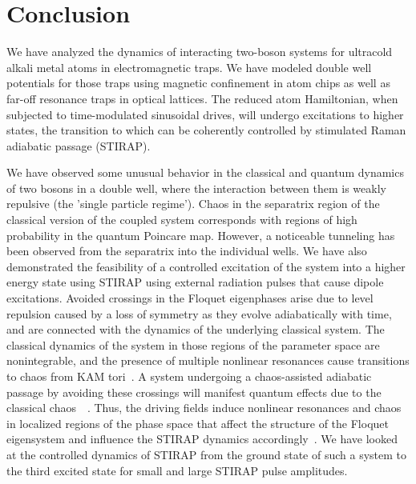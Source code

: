\chapter{Conclusion}
%
\label{chapter-conclusion}
We have analyzed the dynamics of interacting two-boson systems for ultracold alkali metal atoms in electromagnetic traps. We have modeled double well potentials for those traps using magnetic confinement in atom chips as well as far-off resonance traps in optical lattices. The reduced atom Hamiltonian, when subjected to time-modulated sinusoidal drives, will undergo excitations to higher states, the transition to which can be coherently controlled by stimulated Raman adiabatic passage (STIRAP).

We have observed some unusual behavior in the classical and quantum dynamics of two bosons in a double well, where the interaction between them is weakly repulsive (the 'single particle regime'). Chaos in the separatrix region of the classical version of the coupled system corresponds with regions of high probability in the quantum Poincare map. However, a noticeable tunneling has been observed from the separatrix into the individual wells. We have also demonstrated the feasibility of a controlled excitation of the system into a higher energy state using STIRAP using external radiation pulses that cause dipole excitations. Avoided crossings in the Floquet eigenphases arise due to level repulsion caused by a loss of symmetry as they evolve adiabatically with time, and are connected with the dynamics of the underlying classical system. The classical dynamics of the system in those regions of the parameter space are nonintegrable, and the presence of multiple nonlinear resonances cause transitions to chaos from KAM tori~\cite{reichl}. A system undergoing a chaos-assisted adiabatic passage by avoiding these crossings will manifest quantum effects due to the classical chaos~\cite{reichl}~\cite{latka:avoidedcrossings:chaos}. Thus, the driving fields induce nonlinear resonances and chaos in localized regions of the phase space that affect the structure of the Floquet eigensystem and influence the STIRAP dynamics accordingly~\cite{na-reichl:pbox}. We have looked at the controlled dynamics of STIRAP from the ground state of such a system to the third excited state for small and large STIRAP pulse amplitudes. 

